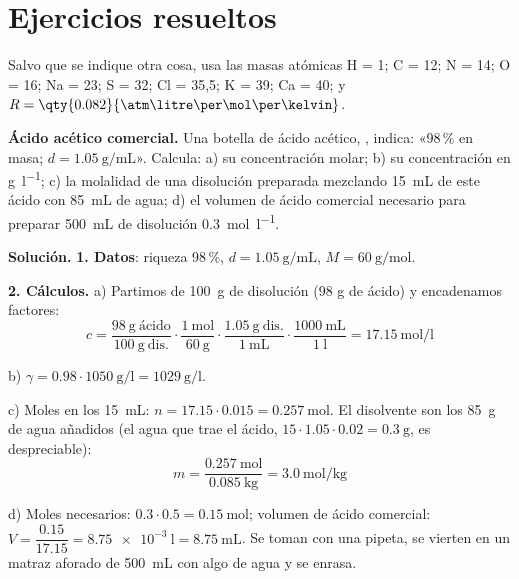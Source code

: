 
\section{Ejercicios resueltos}\label{sec:ud2-resueltos}

Salvo que se indique otra cosa, usa las masas atómicas H = 1; C = 12; N = 14; O = 16; Na = 23; S = 32; Cl = 35,5; K = 39;
Ca = 40; y \(R = \qty{0.082}{\atm\litre\per\mol\per\kelvin}\).

\begin{example}
    \textbf{Ácido acético comercial.} Una botella de ácido acético, , indica: «98\,\% en masa;
    \(d = \qty{1.05}{\gram\per\mL}\)». Calcula: a) su concentración molar; b) su concentración en \unit{\gram\per\litre};
    c) la molalidad de una disolución preparada mezclando \qty{15}{\mL} de este ácido con \qty{85}{\mL} de agua; d) el volumen
    de ácido comercial necesario para preparar \qty{500}{\mL} de disolución \qty{0.3}{\mol\per\litre}.

    \textbf{Solución.} \textbf{1. Datos}: riqueza 98\,\%, \(d = \qty{1.05}{\gram\per\mL}\), \(M = \qty{60}{\gram\per\mol}\).

    \textbf{2. Cálculos.} a) Partimos de \qty{100}{\gram} de disolución (98 g de ácido) y encadenamos factores:
    \[ c = \frac{\qty{98}{\gram}\ \text{ácido}}{\qty{100}{\gram}\ \text{dis.}} \cdot \frac{\qty{1}{\mol}}{\qty{60}{\gram}} \cdot
    \frac{\qty{1.05}{\gram}\ \text{dis.}}{\qty{1}{\mL}} \cdot \frac{\qty{1000}{\mL}}{\qty{1}{\litre}} = \qty{17.15}{\mol\per\litre} \]

    b) \(\gamma = \num{0.98} \cdot \qty{1050}{\gram\per\litre} = \qty{1029}{\gram\per\litre}\).

    c) Moles en los \qty{15}{\mL}: \(n = \num{17.15} \cdot \num{0.015} = \qty{0.257}{\mol}\). El disolvente son los \qty{85}{\gram}
    de agua añadidos (el agua que trae el ácido, \(15 \cdot \num{1.05} \cdot \num{0.02} = \qty{0.3}{\gram}\), es despreciable):
    \[ m = \frac{\qty{0.257}{\mol}}{\qty{0.085}{\kilo\gram}} = \qty{3.0}{\mol\per\kilo\gram} \]

    d) Moles necesarios: \(\num{0.3} \cdot \num{0.5} = \qty{0.15}{\mol}\); volumen de ácido comercial:
    \(V = \dfrac{\num{0.15}}{\num{17.15}} = \qty{8.75e-3}{\litre} = \qty{8.75}{\mL}\). Se toman con una pipeta, se vierten en un
    matraz aforado de \qty{500}{\mL} con algo de agua y se enrasa.
\end{example}

